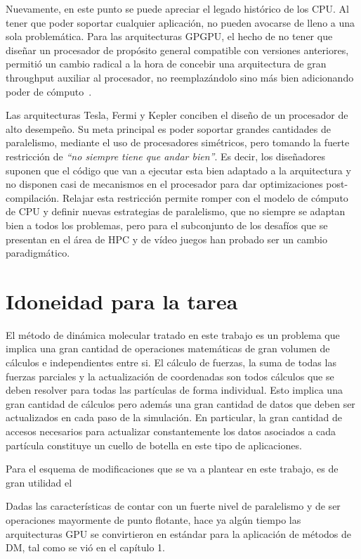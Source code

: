 Nuevamente, en este punto se puede apreciar el legado hist\'orico de los CPU.
Al tener que poder soportar cualquier aplicaci\'on, no pueden avocarse de lleno a una sola problem\'atica.
Para las arquitecturas GPGPU, el hecho de no tener que dise\~nar un procesador de prop\'osito general compatible con versiones anteriores, permiti\'o un cambio radical a la hora de concebir una arquitectura de gran throughput auxiliar al procesador, no reemplaz\'andolo sino m\'as bien adicionando poder de c\'omputo~\cite{GlaskowskyFermi}.

Las arquitecturas Tesla, Fermi y Kepler conciben el dise\~no de un procesador de alto desempe\~no.
Su meta principal es poder soportar grandes cantidades de paralelismo, mediante el uso de procesadores sim\'etricos, pero tomando la fuerte restricci\'on de \textsl{``no siempre tiene que andar bien''}.
Es decir, los dise\~nadores suponen que el c\'odigo que van a ejecutar esta bien adaptado a la arquitectura y no disponen casi de mecanismos en el procesador para dar optimizaciones post-compilaci\'on.
Relajar esta restricci\'on permite romper con el modelo de c\'omputo de CPU y definir nuevas estrategias de paralelismo, que no siempre se adaptan bien a todos los problemas, pero para el subconjunto de los desaf\'ios que se presentan en el \'area de HPC y de v\'ideo juegos han probado ser un cambio paradigm\'atico.

\section{Idoneidad para la tarea}

El método de dinámica molecular tratado en este trabajo es un problema que implica una gran cantidad de operaciones matemáticas de gran volumen de cálculos e independientes entre si.
El cálculo de fuerzas, la suma de todas las fuerzas parciales y la actualización de coordenadas son todos cálculos que se deben resolver para todas las partículas de forma individual. 
Esto implica una gran cantidad de cálculos pero además una gran cantidad de datos que deben ser actualizados en cada paso de la simulación.
En particular, la gran cantidad de accesos necesarios para actualizar constantemente los datos asociados a cada partícula constituye un cuello de botella en este tipo de aplicaciones.

Para el esquema de modificaciones que se va a plantear en este trabajo, es de gran utilidad el 

Dadas las caracter\'isticas de contar con un fuerte nivel de paralelismo y de ser operaciones mayormente de punto flotante, hace ya algún tiempo 
las arquitecturas GPU se convirtieron en estándar para la aplicación de métodos de DM, tal como se vió en el capítulo 1.

